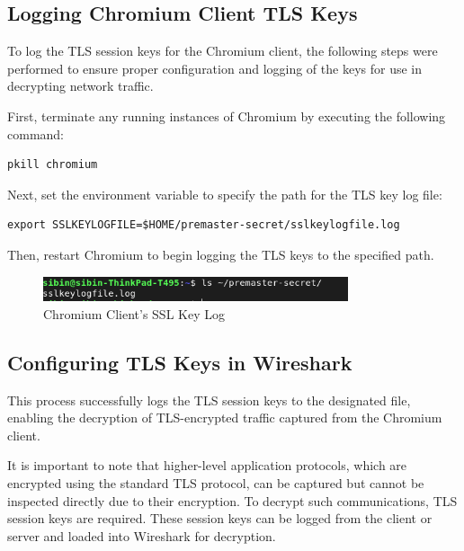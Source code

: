\subsection{Logging Chromium Client TLS Keys}
To log the TLS session keys for the Chromium client, the following steps were performed to ensure proper configuration and logging of the keys for use in decrypting network traffic.

First, terminate any running instances of Chromium by executing the following command:

\begin{lstlisting}[breaklines=true,basicstyle=\small\ttfamily,frame=single]
pkill chromium
\end{lstlisting}

Next, set the environment variable to specify the path for the TLS key log file:

\begin{lstlisting}[breaklines=true,basicstyle=\small\ttfamily,frame=single]
export SSLKEYLOGFILE=$HOME/premaster-secret/sslkeylogfile.log
\end{lstlisting}

Then, restart Chromium to begin logging the TLS keys to the specified path.

\begin{figure}[h!]
    \centering
    \includegraphics[width=0.8\textwidth]{implementation/sslkeylog.png}
    \caption{Chromium Client's SSL Key Log}
    \label{fig:chromiumssl}
\end{figure}

\subsection{Configuring TLS Keys in Wireshark}

This process successfully logs the TLS session keys to the designated file, enabling the decryption of TLS-encrypted traffic captured from the Chromium client.

It is important to note that higher-level application protocols, which are encrypted using the standard TLS protocol, can be captured but cannot be inspected directly due to their encryption. To decrypt such communications, TLS session keys are required. These session keys can be logged from the client or server and loaded into Wireshark for decryption.

